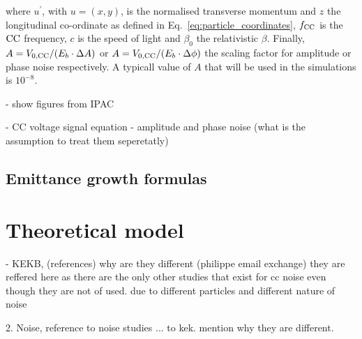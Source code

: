 where $u^\prime$, with $u=(x,y)$, is the normalised transverse momentum and $z$ the longitudinal co-ordinate as defined in Eq.~\eqref{eq:particle_coordinates}, ${f_\mathrm{CC}}$ is the ${\mathrm{CC}}$ frequency, $c$ is the speed of light and $\beta_0$ the relativistic $\beta$. Finally, $A={V_\mathrm{0, CC}} /(E_b \cdot \Delta A )$ or $A={V_\mathrm{0, CC}} /(E_b \cdot \Delta \phi )$ the scaling factor for amplitude or phase noise respectively. A typicall value of $A$ that will be used in the simulations is $10^{-8}$.


- show figures from IPAC

- CC voltage signal equation 
- amplitude and phase noise (what is the assumption to treat them seperetatly)



\subsection{Emittance growth formulas}




\section{Theoretical model}\label{eq:CC_emit_growth_formulas}


- KEKB, (references) why are they different (philippe email exchange) they are reffered here as there are the only other studies that exist for cc noise even though they are not of used. due to different particles and different nature of noise


2. Noise, reference to noise studies ... to kek. mention why they are different.\\



